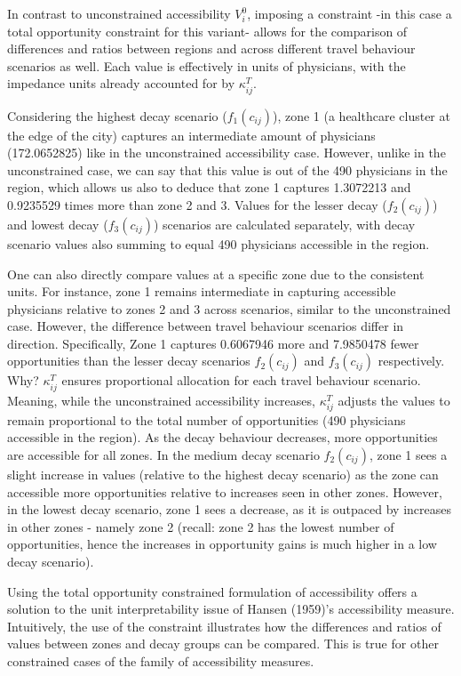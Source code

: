 \documentclass[
11pt, %
oneside, %
english, %
singlespacing, %
]{macthesis} %
\begin{document}


In contrast to unconstrained accessibility \(V^0_i\), imposing a constraint -in this case a total opportunity constraint for this variant- allows for the comparison of differences and ratios between regions and across different travel behaviour scenarios as well. Each value is effectively in units of physicians, with the impedance units already accounted for by \(\kappa_{ij}^T\).

Considering the highest decay scenario (\(f_1(c_{ij})\)), zone 1 (a healthcare cluster at the edge of the city) captures an intermediate amount of physicians (172.0652825) like in the unconstrained accessibility case. However, unlike in the unconstrained case, we can say that this value is out of the 490 physicians in the region, which allows us also to deduce that zone 1 captures 1.3072213 and 0.9235529 times more than zone 2 and 3. Values for the lesser decay (\(f_2(c_{ij})\)) and lowest decay (\(f_3(c_{ij})\)) scenarios are calculated separately, with decay scenario values also summing to equal 490 physicians accessible in the region.

One can also directly compare values at a specific zone due to the consistent units. For instance, zone 1 remains intermediate in capturing accessible physicians relative to zones 2 and 3 across scenarios, similar to the unconstrained case. However, the difference between travel behaviour scenarios differ in direction. Specifically, Zone 1 captures 0.6067946 more and 7.9850478 fewer opportunities than the lesser decay scenarios \(f_2(c_{ij})\) and \(f_3(c_{ij})\) respectively. Why? \(\kappa_{ij}^T\) ensures proportional allocation for each travel behaviour scenario. Meaning, while the unconstrained accessibility increases, \(\kappa_{ij}^T\) adjusts the values to remain proportional to the total number of opportunities (490 physicians accessible in the region). As the decay behaviour decreases, more opportunities are accessible for all zones. In the medium decay scenario \(f_2(c_{ij})\), zone 1 sees a slight increase in values (relative to the highest decay scenario) as the zone can accessible more opportunities relative to increases seen in other zones. However, in the lowest decay scenario, zone 1 sees a decrease, as it is outpaced by increases in other zones - namely zone 2 (recall: zone 2 has the lowest number of opportunities, hence the increases in opportunity gains is much higher in a low decay scenario).

Using the total opportunity constrained formulation of accessibility offers a solution to the unit interpretability issue of Hansen (1959)'s accessibility measure. Intuitively, the use of the constraint illustrates how the differences and ratios of values between zones and decay groups can be compared. This is true for other constrained cases of the family of accessibility measures.
\end{document}
